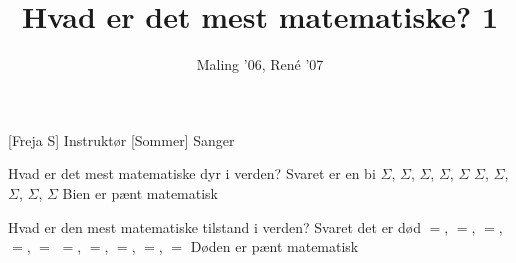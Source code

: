 \documentclass[a4paper,11pt]{article}
\title{Hvad er det mest matematiske? 1}
\author{Maling '06, René '07}
\begin{document}
\maketitle

\begin{roles}
[Freja S] Instruktør
[Sommer] Sanger
\end{roles}

\begin{song}
 Hvad er det mest matematiske dyr i verden?
Svaret er en bi
$\Sigma$, $\Sigma$, $\Sigma$, $\Sigma$, $\Sigma$
$\Sigma$, $\Sigma$, $\Sigma$, $\Sigma$, $\Sigma$
Bien er pænt matematisk

 Hvad er den mest matematiske tilstand i verden?
Svaret det er død
$=$, $=$, $=$, $=$, $=$
$=$, $=$, $=$, $=$, $=$
Døden er pænt matematisk
\end{song}
\end{document}
